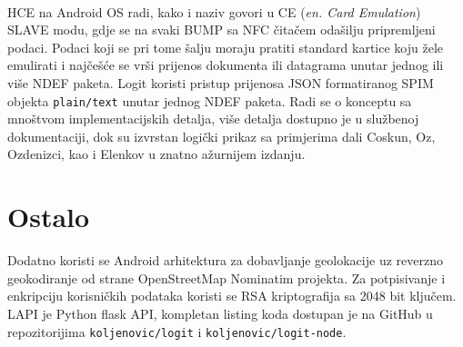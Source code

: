 \paragraph*{}
HCE na Android OS radi, kako i naziv govori u CE (\textit{en. Card Emulation}) SLAVE modu, gdje se na svaki BUMP sa NFC čitačem odašilju pripremljeni podaci. Podaci koji se pri tome šalju moraju pratiti standard kartice koju žele emulirati i najčešće se vrši prijenos dokumenta ili datagrama unutar jednog ili više NDEF paketa. Logit koristi pristup prijenosa JSON formatiranog SPIM objekta \texttt{plain/text} unutar jednog NDEF paketa. Radi se o konceptu sa mnoštvom implementacijskih detalja, više detalja dostupno je u službenoj dokumentaciji\cite{androidhce_2018}, dok su izvrstan logički prikaz sa primjerima dali Coskun, Oz, Ozdenizci\cite{coskunAndroid}\cite{coskunNFC}, kao i Elenkov\cite{Elenkov2015} u znatno ažurnijem izdanju.

\section{Ostalo}
Dodatno koristi se Android arhitektura za dobavljanje geolokacije\cite{geoa} uz reverzno geokodiranje od strane OpenStreetMap Nominatim projekta\cite{nominatim}. Za potpisivanje i enkripciju korisničkih podataka koristi se RSA\cite{rivest1978method} kriptografija sa 2048 bit ključem. LAPI je Python flask API, kompletan listing koda dostupan je na GitHub u repozitorijima \texttt{koljenovic/logit} i \texttt{koljenovic/logit-node}.
